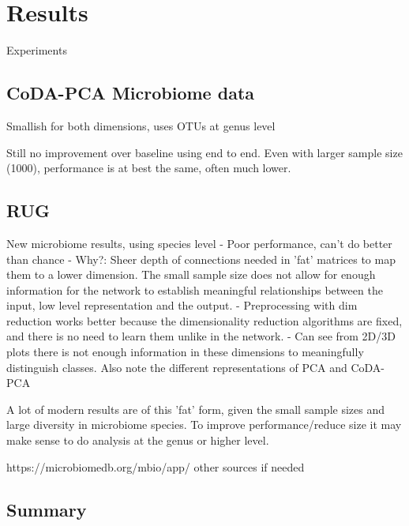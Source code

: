 \chapter{Results}
\label{cha:result}
Experiments 
\section{CoDA-PCA Microbiome data}
Smallish for both dimensions, uses OTUs at genus level

Still no improvement over baseline using end to end. Even with larger sample size (1000), performance is at best the same, often much lower.  

\section{RUG}
New microbiome results, using species level  
- Poor performance, can't do better than chance
- Why?: Sheer depth of connections needed in 'fat' matrices to map them to a lower dimension. The small sample size does not allow for enough information for the network to establish meaningful relationships between the input, low level representation and the output. 
- Preprocessing with dim reduction works better because the dimensionality reduction algorithms are fixed, and there is no need to learn them unlike in the network.
- Can see from 2D/3D plots there is not enough information in these dimensions to meaningfully distinguish classes. Also note the different representations of PCA and CoDA-PCA

A lot of modern results are of this 'fat' form, given the small sample sizes and large diversity in microbiome species. To improve performance/reduce size it may make sense to do analysis at the genus or higher level. 

https://microbiomedb.org/mbio/app/ other sources if needed





\section{Summary}

